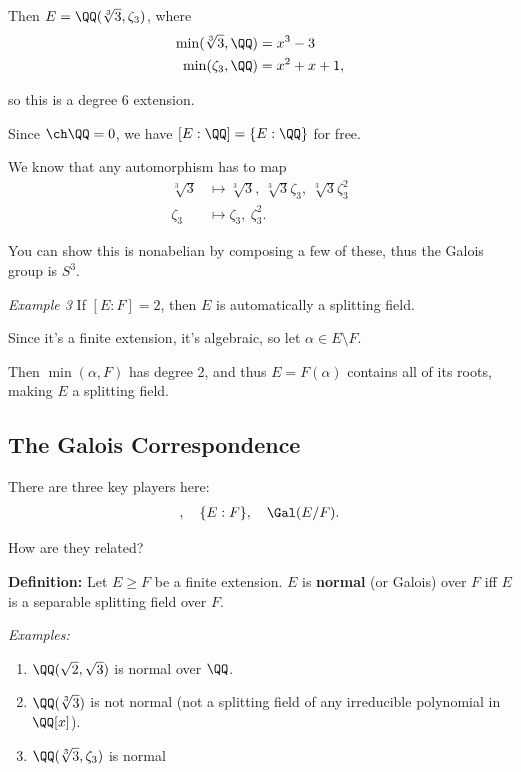 Then \(E = \QQ(\sqrt[3] 3, \zeta_3)\), where \begin{align*}
\min(\sqrt[3] 3, \QQ) &= x^3 - 3 \\
\min(\zeta_3, \QQ) &= x^2 + x + 1
,\end{align*}

so this is a degree 6 extension.

Since \(\ch \QQ = 0\), we have \([E: \QQ] = \{E: \QQ\}\) for free.

We know that any automorphism has to map \begin{align*}
\sqrt[3] 3 &\mapsto \sqrt[3] 3,~ \sqrt[3] 3 \zeta_3,~ \sqrt[3] 3 \zeta_3^2 \\
\zeta_3 &\mapsto \zeta_3,~ \zeta_3^2
.\end{align*}

You can show this is nonabelian by composing a few of these, thus the
Galois group is \(S^3\).

\emph{Example 3} If \([E: F] = 2\), then \(E\) is automatically a
splitting field.

Since it's a finite extension, it's algebraic, so let
\(\alpha \in E\setminus F\).

Then \(\min(\alpha, F)\) has degree 2, and thus \(E = F(\alpha)\)
contains all of its roots, making \(E\) a splitting field.

\hypertarget{the-galois-correspondence}{%
\subsection{The Galois Correspondence}\label{the-galois-correspondence}}

There are three key players here:
\begin{align*}
[E: F],\quad  \{E: F\},\quad \Gal(E/F)
.\end{align*}

How are they related?

\textbf{Definition:} Let \(E \geq F\) be a finite extension. \(E\) is
\textbf{normal} (or Galois) over \(F\) iff \(E\) is a separable
splitting field over \(F\).

\emph{Examples:}

\begin{enumerate}
\def\labelenumi{\arabic{enumi}.}
\item
  \(\QQ(\sqrt 2, \sqrt 3)\) is normal over \(\QQ\).
\item
  \(\QQ(\sqrt[3] 3)\) is not normal (not a splitting field of any
  irreducible polynomial in \(\QQ[x]\)).
\item
  \(\QQ(\sqrt[3] 3, \zeta_3)\) is normal
\end{enumerate}

